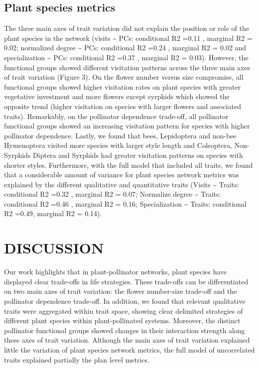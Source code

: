\documentclass[12pt,a4paper,]{article}
\begin{document}
\subsection{Plant species metrics}\label{plant-species-metrics}

The three main axes of trait variation did not explain the position or
role of the plant species in the network (visits \textasciitilde{} PCs:
conditional R2 =0.11 , marginal R2 = 0.02; normalized degree
\textasciitilde{} PCs: conditional R2 =0.24 , marginal R2 = 0.02 and
specialization \textasciitilde{} PCs: conditional R2 =0.37 , marginal R2
= 0.03). However, the functional groups showed different visitation
patterns across the three main axes of trait variation (Figure 3). On
the flower number versus size compromise, all functional groups showed
higher visitation rates on plant species with greater vegetative
investment and more flowers except syrphids which showed the opposite
trend (higher visitation on species with larger flowers and associated
traits). Remarkably, on the pollinator dependence trade-off, all
pollinator functional groups showed an increasing visitation pattern for
species with higher pollinator dependence. Lastly, we found that bees,
Lepidoptera and non-bee Hymenoptera visited more species with larger
style length and Coleoptera, Non-Syrphids Diptera and Syrphids had
greater visitation patterns on species with shorter styles. Furthermore,
with the full model that included all traits, we found that a
considerable amount of variance for plant species network metrics was
explained by the different qualitative and quantitative traits (Visits
\textasciitilde{} Traits: conditional R2 =0.32 , marginal R2 = 0.07;
Normalize degree \textasciitilde{} Traits: conditional R2 =0.46 ,
marginal R2 = 0.16; Specialization \textasciitilde{} Traits: conditional
R2 =0.49, marginal R2 = 0.14).

\section{DISCUSSION}\label{discussion}

Our work highlights that in plant-pollinator networks, plant species
have displayed clear trade-offs in life strategies. These trade-offs can
be differentiated on two main axes of trait variation: the flower
number-size trade-off and the pollinator dependence trade-off. In
addition, we found that relevant qualitative traits were aggregated
within trait space, showing clear delimited strategies of different
plant species within plant-pollinated systems. Moreover, the distinct
pollinator functional groups showed changes in their interaction
strength along these axes of trait variation. Although the main axes of
trait variation explained little the variation of plant species network
metrics, the full model of uncorrelated traits explained partially the
plan level metrics.
\end{document}
